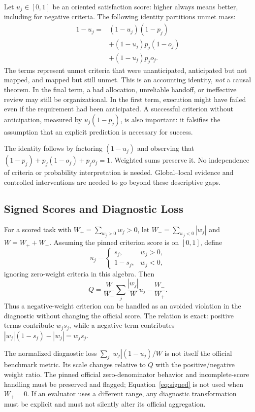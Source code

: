 Let $u_j\in[0,1]$ be an oriented satisfaction score: higher always means better, including for negative criteria. The following identity partitions unmet mass:
\begin{align}
1-u_j={}&(1-u_j)(1-p_j)\nonumber\\
&+(1-u_j)p_j(1-o_j)\nonumber\\
&+(1-u_j)p_jo_j.\label{eq:partition}
\end{align}
The terms represent unmet criteria that were unanticipated, anticipated but not mapped, and mapped but still unmet. This is an accounting identity, \emph{not} a causal theorem. In the final term, a bad allocation, unreliable handoff, or ineffective review may still be organizational. In the first term, execution might have failed even if the requirement had been anticipated. A successful criterion without anticipation, measured by $u_j(1-p_j)$, is also important: it falsifies the assumption that an explicit prediction is necessary for success.

The identity follows by factoring $(1-u_j)$ and observing that $(1-p_j)+p_j(1-o_j)+p_jo_j=1$. Weighted sums preserve it. No independence of criteria or probability interpretation is needed. Global--local evidence and controlled interventions are needed to go beyond these descriptive gaps.

\subsection{Signed Scores and Diagnostic Loss}

For a scored task with $W_+=\sum_{w_j>0}w_j>0$, let $W_-=\sum_{w_j<0}|w_j|$ and $W=W_++W_-$. Assuming the pinned criterion score is on $[0,1]$, define
\begin{equation}
u_j=\begin{cases}s_j,&w_j>0,\\1-s_j,&w_j<0,\end{cases}
\end{equation}
ignoring zero-weight criteria in this algebra. Then
\begin{equation}
Q=\frac{W}{W_+}\sum_j\frac{|w_j|}{W}u_j-\frac{W_-}{W_+}.
\label{eq:signed}
\end{equation}
Thus a negative-weight criterion can be handled as an avoided violation in the diagnostic without changing the official score. The relation is exact: positive terms contribute $w_js_j$, while a negative term contributes $|w_j|(1-s_j)-|w_j|=w_js_j$.

The normalized diagnostic loss $\sum_j|w_j|(1-u_j)/W$ is not itself the official benchmark metric. Its scale changes relative to $Q$ with the positive/negative weight ratio. The pinned official zero-denominator behavior and incomplete-score handling must be preserved and flagged; Equation~\ref{eq:signed} is not used when $W_+=0$. If an evaluator uses a different range, any diagnostic transformation must be explicit and must not silently alter its official aggregation.

